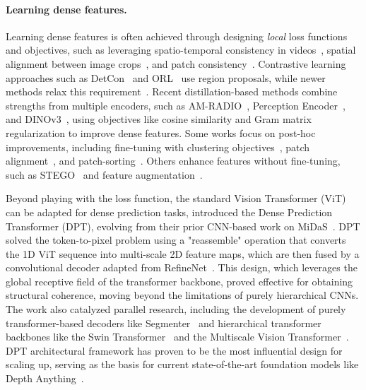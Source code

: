 \documentclass[]{fairmeta}
\begin{document}
\paragraph{\textbf{Learning dense features.}}

Learning dense features is often achieved through designing \textit{local} loss functions and objectives, such as leveraging spatio-temporal consistency in videos~\citep{jabri2020space}, spatial alignment between image crops~\citep{pinheiro2020unsupervised, bardes2022vicregl}, and patch consistency~\citep{yun2022patch}. Contrastive learning approaches such as DetCon~\citep{henaff2021efficient} and ORL~\citep{xie2021unsupervised} use region proposals, while newer methods relax this requirement~\citep{henaff2022object, wen2022slotcon}. Recent distillation-based methods combine strengths from multiple encoders, such as AM-RADIO~\citep{ranzinger2024radio}, Perception Encoder~\citep{bolya2025perception}, and DINOv3~\citep{simeoni2025dinov3}, using objectives like cosine similarity and Gram matrix regularization to improve dense features. Some works focus on post-hoc improvements, including fine-tuning with clustering objectives~\citep{ziegler2022self}, patch alignment~\citep{salehi2023time}, and patch-sorting~\citep{pariza2025near}. Others enhance features without fine-tuning, such as STEGO~\citep{hamilton2022unsupervised} and feature augmentation~\citep{simoncini2024no}.

Beyond playing with the loss function, the standard Vision Transformer (ViT)~\citep{dosovitskiy2021vit} can be adapted for dense prediction tasks, \citet{ranftl2021dpt} introduced the Dense Prediction Transformer (DPT), evolving from their prior CNN-based work on MiDaS~\citep{ranftl2020midas}. DPT solved the token-to-pixel problem using a "reassemble" operation that converts the 1D ViT sequence into multi-scale 2D feature maps, which are then fused by a convolutional decoder adapted from RefineNet~\citep{lin2017refinenet}. This design, which leverages the global receptive field of the transformer backbone, proved effective for obtaining structural coherence, moving beyond the limitations of purely hierarchical CNNs. The work also catalyzed parallel research, including the development of purely transformer-based decoders like Segmenter~\citep{strudel2021segmenter} and hierarchical transformer backbones like the Swin Transformer~\citep{liu2021swin} and the Multiscale Vision Transformer~\citep{fan2021multiscale}. DPT architectural framework has proven to be the most influential design for scaling up, serving as the basis for current state-of-the-art foundation models like Depth Anything~\citep{yang2024depthanything}.
\end{document}
